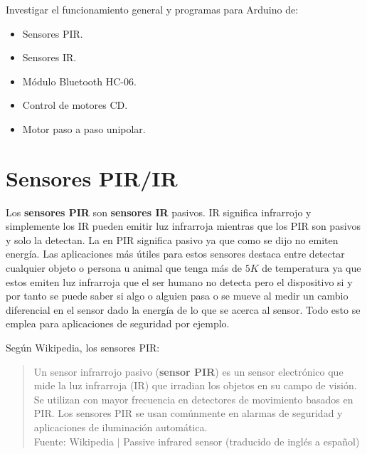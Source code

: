 \documentclass[conference]{IEEEtran}
\begin{document}
    Investigar el funcionamiento general y programas para Arduino de:

    \begin{itemize}
        \item Sensores PIR\@.
        \item Sensores IR\@.
        \item Módulo Bluetooth HC-06.
        \item Control de motores CD\@.
        \item Motor paso a paso unipolar.
    \end{itemize}

    \section{Sensores PIR/IR}\label{sec:sensores-pir/ir}

    Los \textbf{sensores PIR} son \textbf{sensores IR} pasivos. IR significa infrarrojo y simplemente los IR pueden emitir luz infrarroja mientras que los PIR son pasivos y solo la detectan. La  en PIR significa pasivo ya que como se dijo no emiten energía. Las aplicaciones más útiles para estos sensores destaca entre detectar cualquier objeto o persona u animal que tenga más de $5K$ de temperatura ya que estos emiten luz infrarroja que el ser humano no detecta pero el dispositivo si \cite{jost-ir-sensor-2019} y por tanto se puede saber si algo o alguien pasa o se mueve al medir un cambio diferencial en el sensor dado la energía de lo que se acerca al sensor. Todo esto se emplea para aplicaciones de seguridad por ejemplo.

    \bigbreak

    Según Wikipedia, los sensores PIR:

    \begin{quote}
        Un sensor infrarrojo pasivo (\textbf{sensor PIR}) es un sensor electrónico que mide la luz infrarroja (IR) que irradian los objetos en su campo de visión. Se utilizan con mayor frecuencia en detectores de movimiento basados en PIR. Los sensores PIR se usan comúnmente en alarmas de seguridad y aplicaciones de iluminación automática.\\
        \small Fuente: Wikipedia $\mid$ Passive infrared sensor (traducido de inglés a español) \cite{wikipedia-pir-sensor-2022}
    \end{quote}
\end{document}
